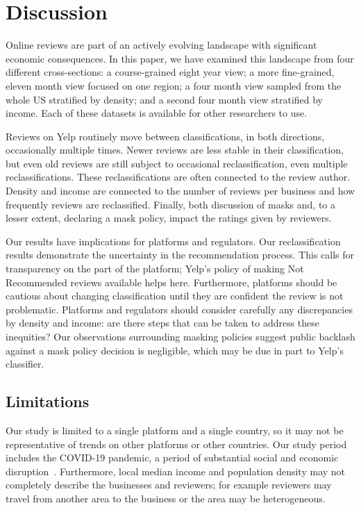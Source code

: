 \section{Discussion} \label{sec:discussion}
Online reviews are part of an actively evolving landscape with significant economic consequences. In this paper, we have examined this landscape from four different cross-sections: a course-grained eight year view;
a more fine-grained, eleven month view focused on one region; a four month view sampled from the whole US stratified by density; and a second four month view stratified by income. Each of these datasets is available for other researchers to use.

Reviews on Yelp routinely move between classifications, in both directions, occasionally multiple times. Newer reviews are less stable in their classification, but even old reviews are still subject to occasional reclassification, even multiple reclassifications. These reclassifications are often connected to the review author. Density and income are connected to the number of reviews per business and how frequently reviews are reclassified. Finally, both discussion of masks and, to a lesser extent, declaring a mask policy, impact the ratings given by reviewers.

Our results have implications for platforms and regulators. Our reclassification results demonstrate the uncertainty in the recommendation process. This calls for transparency on the part of the platform; Yelp's policy of making Not Recommended reviews available helps here. Furthermore, platforms should be cautious about changing classification until they are confident the review is not problematic. 
Platforms and regulators should consider carefully any discrepancies by density and income: are there steps that can be taken to address these inequities? Our observations surrounding masking policies suggest public backlash against a mask policy decision is negligible, which may be due in part to Yelp's classifier.


\subsection{Limitations} \label{subsec:limitations}

Our study is limited to a single platform and a single country, so it may not be representative of trends on other platforms or other countries. Our study period includes the COVID-19 pandemic, a period of substantial social and economic disruption~\cite{altig2020economic,deb2020economic}. Furthermore, local median income and population density may not completely describe the businesses and reviewers; for example reviewers may travel from another area to the business or the area may be heterogeneous.

